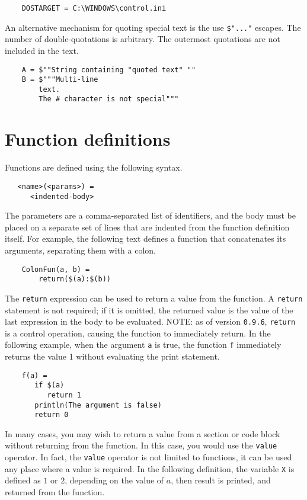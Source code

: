\begin{verbatim}
    DOSTARGET = C:\WINDOWS\control.ini
\end{verbatim}

An alternative mechanism for quoting special text is the use \verb+$"..."+ escapes.  The number of
double-quotations is arbitrary.  The outermost quotations are not included in the text.

\begin{verbatim}
    A = $""String containing "quoted text" ""
    B = $"""Multi-line
        text.
        The # character is not special"""
\end{verbatim}

\section{Function definitions}
\label{section:functions}

Functions are defined using the following syntax.

\begin{verbatim}
   <name>(<params>) =
      <indented-body>
\end{verbatim}

The parameters are a comma-separated list of identifiers, and the body must be placed on a separate
set of lines that are indented from the function definition itself.  For example, the following text
defines a function that concatenates its arguments, separating them with a colon.

\begin{verbatim}
    ColonFun(a, b) =
        return($(a):$(b))
\end{verbatim}

The \verb+return+ expression can be used to return a value from the function.  A \verb+return+
statement is not required; if it is omitted, the returned value is the value of the last expression
in the body to be evaluated.  NOTE: as of version \verb+0.9.6+, \verb+return+ is a control
operation, causing the function to immediately return.  In the following example, when the argument
\verb+a+ is true, the function \verb+f+ immediately returns the value 1 without evaluating the print
statement.

\begin{verbatim}
    f(a) =
       if $(a)
          return 1
       println(The argument is false)
       return 0
\end{verbatim}

In many cases, you may wish to return a value from a section or code block without returning from
the function.  In this case, you would use the \verb+value+ operator.  In fact, the \verb+value+
operator is not limited to functions, it can be used any place where a value is required.  In the
following definition, the variable \verb+X+ is defined as $1$ or $2$, depending on the value of $a$,
then result is printed, and returned from the function.

